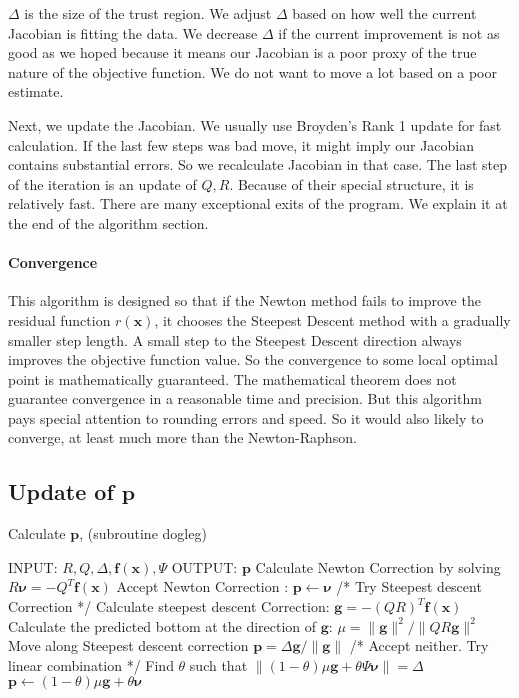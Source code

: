 \documentclass[12pt]{article}
\def\xb{{\mathbf{x}}}
\def\fb{{\mathbf{f}}}
\def\nub{{\mathbf{\nu}}}
\def\gb{{\mathbf{g}}}
\def\pb{{\mathbf{p}}}
\begin{document}
$\Delta $ is the size of the trust region.  We adjust $\Delta$ based on how well the current Jacobian is
fitting the data. We decrease $\Delta$ if the current improvement is not as good as we hoped because
it means our Jacobian is a poor proxy of the true nature of the objective function. We do not want
to move a lot based on a poor estimate.  

Next, we update the Jacobian. We usually use Broyden's Rank 1 update for fast calculation. If the last
few steps was bad move, it might imply our Jacobian contains substantial errors. So we recalculate
Jacobian in that case. The last step of the iteration is an update of $Q, R$.  Because of their special
structure, it is relatively fast. There are many exceptional exits of the program. We explain it at
the end of the algorithm section.

\paragraph{Convergence} 
This algorithm is designed so that if the Newton method fails to improve the residual function
$r(\xb)$, it chooses the Steepest Descent method with a gradually smaller step length. A small step
to the Steepest Descent direction always improves the objective function value. So the convergence
to some local optimal point is mathematically guaranteed. The mathematical theorem does not
guarantee convergence in a reasonable time and precision. But this algorithm pays
special attention to rounding errors and speed. So it would also likely to converge, at least much more than the Newton-Raphson. 



\subsection{Update of $\pb$}
 \begin{algorithm}[ht]
\caption{Calculate  $\pb$, (subroutine dogleg)}
 \label{al:dogleg}
\begin{algorithmic}[1]
\STATE INPUT: $R,Q,\Delta,\fb(\xb),\Psi$
\STATE OUTPUT: $\pb$
\STATE Calculate Newton Correction by solving $R\boldsymbol{\nu} = - Q^{T} \fb (\xb)$
\IF{$\|\boldsymbol{\nu}\|\le \Delta$}
    \STATE  Accept Newton Correction : $\pb \leftarrow \boldsymbol{\nu}$
\ELSE
    \STATE /* Try Steepest descent Correction */
    \STATE Calculate steepest descent Correction: $\boldsymbol{g} = - (QR)^{T} \fb (\xb)$
    \STATE Calculate the predicted bottom at the direction of $\boldsymbol{g}$:
             $\mu = \| \boldsymbol{g} \|^2 / \| QR\boldsymbol{g} \|^2$
    \IF{$\mu \|\Psi^{-1} \gb\| \ge \Delta$} 
        \STATE Move along Steepest descent correction $\pb = \Delta \gb/\|\gb\|$
    \ELSE
        \STATE /* Accept neither. Try linear combination */
        \STATE Find $\theta$ such that $\|(1-\theta)\mu  \gb + \theta\Psi \nub \| = \Delta$
        \STATE $\pb \leftarrow (1-\theta)\mu \gb + \theta \nub$
    \ENDIF
\ENDIF
\end{algorithmic}
\end{algorithm}
\end{document}
